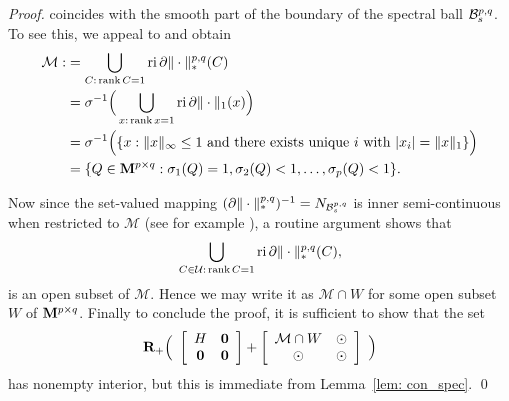 \documentclass[smallextended,numbook]{svjour3}
\begin{document}
\begin{proof}
 coincides with the smooth part of the boundary of the spectral ball ${{\cal B}}^{p,q}_{s}$. To see this, we appeal to \cite[Theorem~4.6]{spec_id} and obtain 
\begin{align*}
\mathcal{M}:&=\bigcup_{C:\, \scriptsize{\mbox{\rm rank}\,} C=1} {\mbox{\rm ri}\,} \partial \|\cdot\|_{*}^{p,q}(C)\\
&= \sigma^{-1}\Big(\bigcup_{x:\, \scriptsize{\mbox{\rm rank}\,} x=1} {\mbox{\rm ri}\,} \partial \|\cdot\|_1(x)\Big)\\
&= \sigma^{-1}\Big(\{x: \|x\|_{\infty}\leq 1 \textrm{ and there exists unique } i \textrm{ with } |x_i|=\|x\|_1\}\Big)\\
&= \{Q \in {\bf M}^{p\times q}: \sigma_1(Q)=1, \sigma_2(Q) <1,\ldots, \sigma_{p}(Q)<1\}.
\end{align*}

Now since the set-valued mapping $(\partial \|\cdot\|_{*}^{p,q})^{-1}=N_{{{\cal B}}^{p,q}_{s}}$ is inner semi-continuous when restricted to $\mathcal{M}$ (see for example \cite[Proposition~3.15]{spec_id}), a routine argument shows that  
$$\bigcup_{C\in \mathcal{U}:\, \scriptsize{\mbox{\rm rank}\,} C=1} {\mbox{\rm ri}\,} \partial \|\cdot\|_{*}^{p,q}(C),$$
is an open subset of $\mathcal{M}$. Hence we may write it as $\mathcal{M}\cap W$ for some open subset $W$ of $ {\bf M}^{p\times q}$.
Finally to conclude the proof, it is sufficient to show that 
the set 
\begin{equation*}
{{\bf R}}_+ \Big(~ \left[ \begin{array}{cc}
H & {\bf 0}  \\
{\bf 0} & {\bf 0} \end{array} \right]  +  \left[ \begin{array}{cc}
\mathcal{M}\cap W & {\bf \odot}  \\
{\bf \odot} & {\bf \odot} \end{array} \right] ~\Big)
 \end{equation*}
 has nonempty interior, but this is immediate from Lemma~\ref{lem: con_spec}.
\qed
\end{proof}
\end{document}
